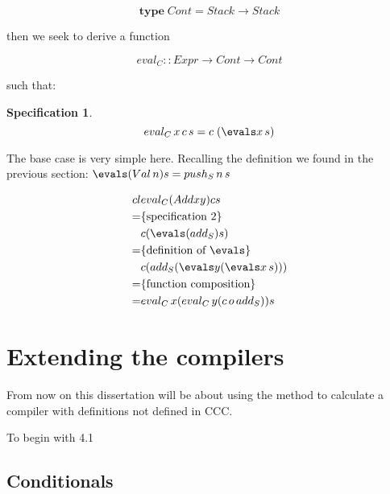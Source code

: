 \documentclass {article}
\begin{document}
\[ \textbf{type} \; Cont = Stack \rightarrow Stack \] 

then we seek to derive a function

\newcommand{\evalc}{eval_{C}}

	\[ \evalc :: Expr \rightarrow Cont \rightarrow Cont \]

such that:

\newtheorem{bhspec2}[bhspecs]{Specification}

\begin{bhspec2}
	\[ \evalc \, x \, c \, s = c \; (\evals x \, s) \] 
\end{bhspec2}

The base case is very simple here.
Recalling the definition we found in the previous section:
\( \evals (Val \, n) s = \pushs \, n \, s\)





\begin{eqnarray*}{cl}
		  & \evalc (Add x y) c s \\
	=	  & \{\mbox{specification 2}\} \\
		  & c (\evals (\adds) s) \\
	=	  & \{\mbox{definition of $\evals$}\} \\
		  & c (\adds (\evals y (\evals x \, s))) \\
	=	  & \{\mbox{function composition}\} \\
	= 	  & \evalc \, x (\evalc \, y (c \, o \, \adds)) s
\end{eqnarray*}

\section{Extending the compilers}

From now on this dissertation will be about using the \BH method to calculate a compiler
with definitions not defined in CCC.

To begin with 4.1

\subsection{Conditionals}













\end{document}
